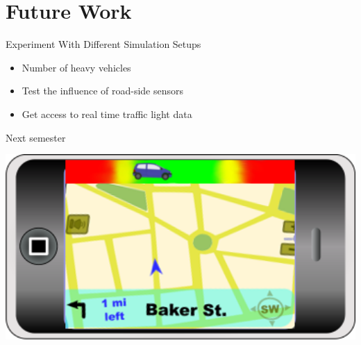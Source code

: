 \section{Future Work}

\begin{frame}{Experiment With Different Simulation Setups}

	\begin{itemize}
		\item Number of heavy vehicles\\
		\item Test the influence of road-side sensors\\
		\item Get access to real time traffic light data\\
	\end{itemize}
	
\end{frame}

\begin{frame}{Next semester}

	\includegraphics[width=1\textwidth]{images/product.png}
	
\end{frame}